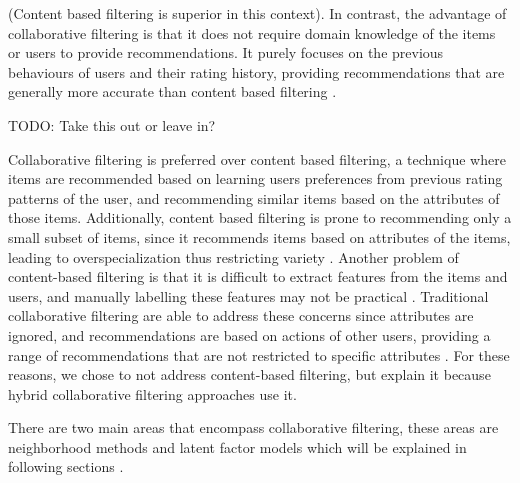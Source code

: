 (Content based filtering is superior in this context). In contrast, the advantage of collaborative filtering is that it does not require domain knowledge of the items or users to provide recommendations. It purely focuses on the previous behaviours of users and their rating history, providing recommendations that are generally more accurate than content based filtering \cite{koren2009matrix, schafer2007collaborative}. 

TODO: Take this out or leave in?

Collaborative filtering is preferred over content based filtering, a technique where items are recommended based on learning users preferences from previous rating patterns of the user, and recommending similar items based on the attributes of those items. Additionally, content based filtering is prone to recommending only a small subset of items, since it recommends items based on attributes of the items, leading to overspecialization thus restricting variety \cite{toward}. Another problem of content-based filtering is that it is difficult to extract features from the items and users, and manually labelling these features may not be practical \cite{toward}. Traditional collaborative filtering are able to address these concerns since attributes are ignored, and recommendations are based on actions of other users, providing a range of recommendations that are not restricted to specific attributes \cite{koren2009matrix}. For these reasons, we chose to not address content-based filtering, but explain it because hybrid collaborative filtering approaches use it. 

There are two main areas that encompass collaborative filtering, these areas are neighborhood methods and latent factor models which will be explained in following sections \cite{koren2009matrix}. 

